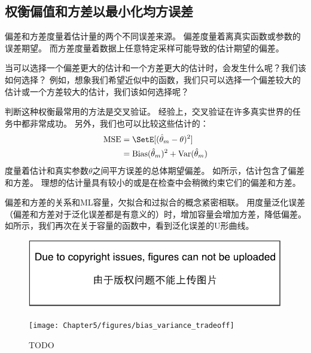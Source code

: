 
\subsection{权衡偏值和方差以最小化均方误差}
\label{sec:trading_off_bias_and_variance_to_minimize_mean_squared_error}
偏差和方差度量着估计量的两个不同误差来源。
偏差度量着离真实函数或参数的误差期望。
而方差度量着数据上任意特定采样可能导致的估计期望的偏差。

当可以选择一个偏差更大的估计和一个方差更大的估计时，会发生什么呢？我们该如何选择？
例如，想象我们希望近似中的函数，我们只可以选择一个偏差较大的估计或一个方差较大的估计，我们该如何选择呢？

判断这种权衡最常用的方法是交叉验证。
经验上，交叉验证在许多真实世界的任务中都非常成功。
另外，我们也可以比较这些估计的：
\begin{align}
    \text{MSE} &= \SetE[ ( \hat{\theta}_m - \theta  )^2 ] \\
        &= \text{Bias}( \hat{\theta}_m )^2 + \text{Var}( \hat{\theta}_m ) \label{eq:5.54}
\end{align}
度量着估计和真实参数$\theta$之间平方误差的总体期望偏差。
如所示，估计包含了偏差和方差。
理想的估计量具有较小的或是在检查中会稍微约束它们的偏差和方差。

偏差和方差的关系和\gls{ML}容量，欠拟合和过拟合的概念紧密相联。
用度量泛化误差（偏差和方差对于泛化误差都是有意义的）时，增加容量会增加方差，降低偏差。
如所示，我们再次在关于容量的函数中，看到泛化误差的U形曲线。

\begin{figure}[!htb]
\ifOpenSource
\centerline{\includegraphics{figure.pdf}}
\else
\centerline{\texttt{[image: Chapter5/figures/bias\_variance\_tradeoff]}}
\fi
\caption{TODO}
\label{fig:chap5_bias_variance_tradeoff}
\end{figure}


